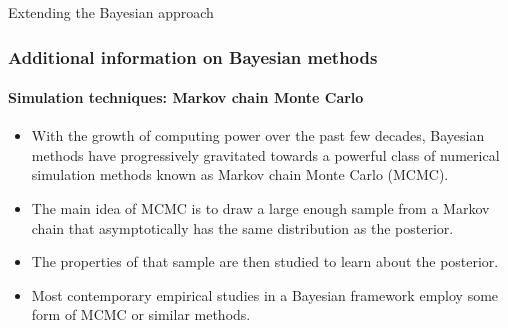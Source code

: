 \documentclass[10pt]{beamer}
\theoremstyle{definition}
\begin{document}
\begin{section}{Extending the Bayesian approach}
\begin{frame}[fragile]
\frametitle{Additional information on Bayesian methods}
\framesubtitle{Simulation techniques: Markov chain Monte Carlo}
\begin{itemize}\itemsep1em
\item With the growth of computing power over the past few decades, Bayesian methods have progressively gravitated towards a powerful class of numerical simulation methods known as Markov chain Monte Carlo (MCMC).
\item The main idea of MCMC is to draw a large enough sample from a  Markov chain that asymptotically has the same distribution as the posterior. 
\item The properties of that sample are then studied to learn about the posterior.
\item Most contemporary empirical studies in a Bayesian framework employ some form of MCMC or similar methods.
\end{itemize}
\end{frame}
\end{section}
\end{document}
